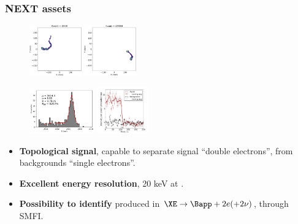 \begin{frame}
\frametitle{NEXT assets}
\begin{figure}[tbh!]
  \begin{center}
      \includegraphics[width=0.20\textwidth]{moriond/single_e.png}
      \includegraphics[width=0.20\textwidth]{moriond/double_e.png}
  \end{center}
 \end{figure}
  
 \begin{figure}[tbh!]
  \begin{center}
      \includegraphics[width=0.25\textwidth]{moriond/CSTH_espectrum_Tl_photopeak_fit.png}
       \includegraphics[width=0.20\textwidth]{moriond/smfi_trayectory.png}    
  \end{center}
 \end{figure}

 
\begin{itemize}
\item {\bf Topological signal}, capable to separate signal ``double electrons'', from backgrounds ``single electrons''. 
\item {\bf Excellent energy resolution}, 20 keV at \Qbb. 
\item {\bf Possibility to identify \Bapp} produced in $\XE \rightarrow \Bapp + 2 e (+ 2 \nu)$, through SMFI. 
\end{itemize}
\end{frame}


